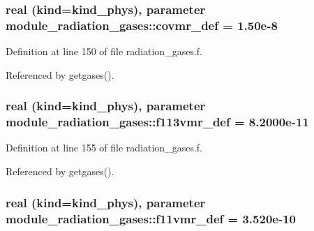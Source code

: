 \subsubsection[{\texorpdfstring{covmr\+\_\+def}{covmr_def}}]{\setlength{\rightskip}{0pt plus 5cm}real (kind=kind\+\_\+phys), parameter module\+\_\+radiation\+\_\+gases\+::covmr\+\_\+def = 1.\+50e-\/8\hspace{0.3cm}{\ttfamily [private]}}\hypertarget{namespacemodule__radiation__gases_a3554bdf03f8222d425bb6c946244cbb5}{}\label{namespacemodule__radiation__gases_a3554bdf03f8222d425bb6c946244cbb5}


Definition at line 150 of file radiation\+\_\+gases.\+f.



Referenced by getgases().

\subsubsection[{\texorpdfstring{f113vmr\+\_\+def}{f113vmr_def}}]{\setlength{\rightskip}{0pt plus 5cm}real (kind=kind\+\_\+phys), parameter module\+\_\+radiation\+\_\+gases\+::f113vmr\+\_\+def = 8.\+2000e-\/11\hspace{0.3cm}{\ttfamily [private]}}\hypertarget{namespacemodule__radiation__gases_a76ec88dc6284c48cfaae6cd05428b6dd}{}\label{namespacemodule__radiation__gases_a76ec88dc6284c48cfaae6cd05428b6dd}


Definition at line 155 of file radiation\+\_\+gases.\+f.



Referenced by getgases().

\subsubsection[{\texorpdfstring{f11vmr\+\_\+def}{f11vmr_def}}]{\setlength{\rightskip}{0pt plus 5cm}real (kind=kind\+\_\+phys), parameter module\+\_\+radiation\+\_\+gases\+::f11vmr\+\_\+def = 3.\+520e-\/10\hspace{0.3cm}{\ttfamily [private]}}\hypertarget{namespacemodule__radiation__gases_a23ae6bb6860bfefef0c281b7106f521e}{}\label{namespacemodule__radiation__gases_a23ae6bb6860bfefef0c281b7106f521e}


